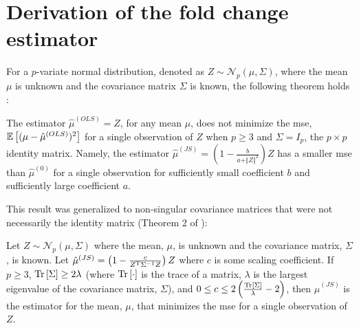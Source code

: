 \section{Derivation of the  fold change estimator}
\label{sec:JS_derivation}

For a $p$-variate normal distribution, denoted as $Z \sim \mathcal{N}_p(\mu, \Sigma)$, where the mean $\mu$ is unknown and the covariance matrix $\Sigma$ is known, the following theorem holds \cite{steinInadmissibilityUsualEstimator1956}:

\begin{theorem}
  The estimator $\hat{\mu}^{(OLS)} = Z$, for any mean $\mu$, does not minimize the \gls{mse}, $\mathbb{E} \left[ (\mu - \hat{\mu}^{(OLS)})^2 \right]$ for a single observation of $Z$ when $p \ge 3$ and $\Sigma = I_p$, the $p \times p$ identity matrix.
  Namely, the estimator $\hat{\mu}^{(JS)} = \left( 1 - \frac{b}{a + \Vert Z \Vert ^2}\right) Z$ has a smaller \gls{mse} than $\hat{\mu}^{(0)}$ for a single observation for sufficiently small coefficient $b$ and sufficiently large coefficient $a$.
\end{theorem}

This result was generalized to non-singular covariance matrices that were not necessarily the identity matrix (Theorem 2 of \cite[REF][]{bockMinimaxEstimatorsMean1975}):

\begin{theorem}
  Let $Z \sim \mathcal{N}_p \left(\mu, \Sigma \right)$ where the mean, $\mu$, is unknown and the covariance matrix, $\Sigma$, is known.
  Let $\hat{\mu}^{(JS)} = \left( 1 - \frac{c}{Z^{\mathrm{T}} \Sigma^{-1} Z}\right) Z$ where $c$ is some scaling coefficient.
  If $p \ge 3$, $\mathrm{Tr} \left[ \Sigma \right] \ge 2 \lambda$ (where $\mathrm{Tr} \left[ \cdot \right]$ is the trace of a matrix, $\lambda$ is the largest eigenvalue of the covariance matrix, $\Sigma$), and $0 \le c \le 2 \left( \frac{\mathrm{Tr} \left[ \Sigma \right]}{\lambda} - 2 \right)$, then $\hat{\mu}^{(JS)}$ is the estimator for the mean, $\mu$, that minimizes the \gls{mse} for a single observation of $Z$.
  \label{thm:js}
\end{theorem}


